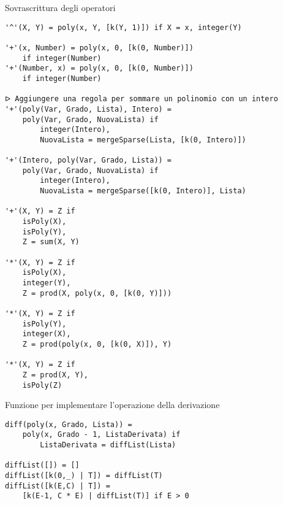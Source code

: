 \documentclass[12pt,twoside]{report}
\begin{document}
Sovrascrittura degli operatori
\begin{lstlisting}
'^'(X, Y) = poly(x, Y, [k(Y, 1)]) if X = x, integer(Y)

'+'(x, Number) = poly(x, 0, [k(0, Number)]) 
    if integer(Number)
'+'(Number, x) = poly(x, 0, [k(0, Number)]) 
    if integer(Number)

ᐅ Aggiungere una regola per sommare un polinomio con un intero
'+'(poly(Var, Grado, Lista), Intero) = 
    poly(Var, Grado, NuovaLista) if 
        integer(Intero),
        NuovaLista = mergeSparse(Lista, [k(0, Intero)])

'+'(Intero, poly(Var, Grado, Lista)) = 
    poly(Var, Grado, NuovaLista) if 
        integer(Intero),
        NuovaLista = mergeSparse([k(0, Intero)], Lista)

'+'(X, Y) = Z if 
    isPoly(X),
    isPoly(Y),
    Z = sum(X, Y)

'*'(X, Y) = Z if 
    isPoly(X),
    integer(Y),
    Z = prod(X, poly(x, 0, [k(0, Y)]))

'*'(X, Y) = Z if 
    isPoly(Y),
    integer(X),
    Z = prod(poly(x, 0, [k(0, X)]), Y)

'*'(X, Y) = Z if 
    Z = prod(X, Y),
    isPoly(Z)
\end{lstlisting}

Funzione per implementare l'operazione della derivazione
\begin{lstlisting}
diff(poly(x, Grado, Lista)) = 
    poly(x, Grado - 1, ListaDerivata) if
        ListaDerivata = diffList(Lista)

diffList([]) = []
diffList([k(0,_) | T]) = diffList(T)
diffList([k(E,C) | T]) = 
    [k(E-1, C * E) | diffList(T)] if E > 0
\end{lstlisting}
\end{document}
